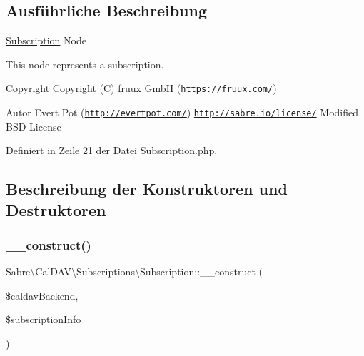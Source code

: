\subsection{Ausführliche Beschreibung}
\mbox{\hyperlink{class_sabre_1_1_cal_d_a_v_1_1_subscriptions_1_1_subscription}{Subscription}} Node

This node represents a subscription.

\begin{DoxyCopyright}{Copyright}
Copyright (C) fruux GmbH (\href{https://fruux.com/}{\tt https\+://fruux.\+com/}) 
\end{DoxyCopyright}
\begin{DoxyAuthor}{Autor}
Evert Pot (\href{http://evertpot.com/}{\tt http\+://evertpot.\+com/})  \href{http://sabre.io/license/}{\tt http\+://sabre.\+io/license/} Modified B\+SD License 
\end{DoxyAuthor}


Definiert in Zeile 21 der Datei Subscription.\+php.



\subsection{Beschreibung der Konstruktoren und Destruktoren}
\mbox{\label{class_sabre_1_1_cal_d_a_v_1_1_subscriptions_1_1_subscription_a714da5a8aeedcd6c9df6baf4f38a255e}} 
\subsubsection{\texorpdfstring{\+\_\+\+\_\+construct()}{\_\_construct()}}
{\footnotesize\ttfamily Sabre\textbackslash{}\+Cal\+D\+A\+V\textbackslash{}\+Subscriptions\textbackslash{}\+Subscription\+::\+\_\+\+\_\+construct (\begin{DoxyParamCaption}\item[{\mbox{\hyperlink{interface_sabre_1_1_cal_d_a_v_1_1_backend_1_1_subscription_support}{Subscription\+Support}}}]{\$caldav\+Backend,  }\item[{array}]{\$subscription\+Info }\end{DoxyParamCaption})}

